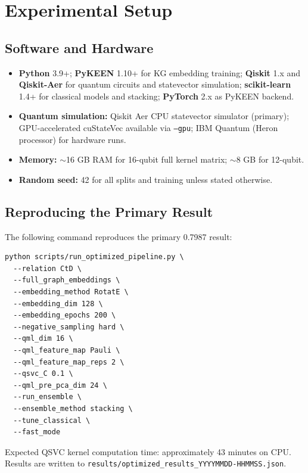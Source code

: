 \documentclass[twocolumn,10pt]{article}
\begin{document}
\section{Experimental Setup}

\subsection{Software and Hardware}

\begin{itemize}[leftmargin=*]
\item \textbf{Python} 3.9+; \textbf{PyKEEN} 1.10+ for KG embedding training; \textbf{Qiskit} 1.x and \textbf{Qiskit-Aer} for quantum circuits and statevector simulation; \textbf{scikit-learn} 1.4+ for classical models and stacking; \textbf{PyTorch} 2.x as PyKEEN backend.
\item \textbf{Quantum simulation:} Qiskit Aer CPU statevector simulator (primary); GPU-accelerated cuStateVec available via \texttt{--gpu}; IBM Quantum (Heron processor) for hardware runs.
\item \textbf{Memory:} ${\sim}$16 GB RAM for 16-qubit full kernel matrix; ${\sim}$8 GB for 12-qubit.
\item \textbf{Random seed:} 42 for all splits and training unless stated otherwise.
\end{itemize}

\subsection{Reproducing the Primary Result}\label{sec:exp_repro}

The following command reproduces the primary 0.7987 result:

\begin{verbatim}
python scripts/run_optimized_pipeline.py \
  --relation CtD \
  --full_graph_embeddings \
  --embedding_method RotatE \
  --embedding_dim 128 \
  --embedding_epochs 200 \
  --negative_sampling hard \
  --qml_dim 16 \
  --qml_feature_map Pauli \
  --qml_feature_map_reps 2 \
  --qsvc_C 0.1 \
  --qml_pre_pca_dim 24 \
  --run_ensemble \
  --ensemble_method stacking \
  --tune_classical \
  --fast_mode
\end{verbatim}

Expected QSVC kernel computation time: approximately 43 minutes on CPU. Results are written to \texttt{results/optimized\_results\_YYYYMMDD-HHMMSS.json}.
\end{document}
